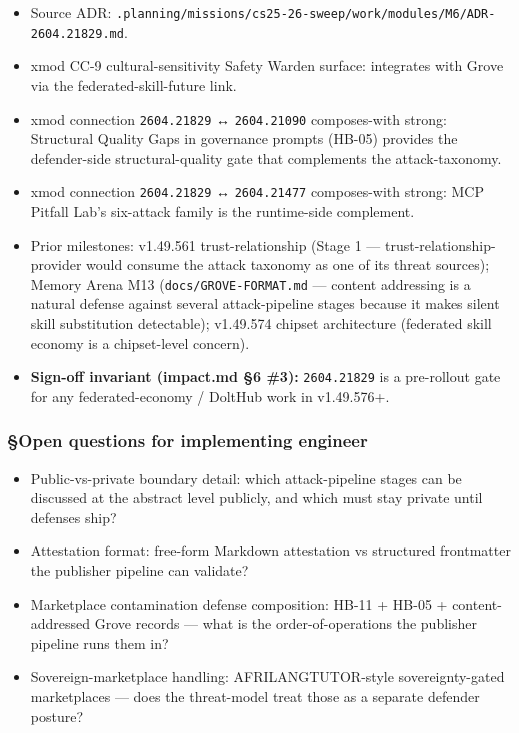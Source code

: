 \documentclass[11pt,letterpaper]{article}
\newcommand{\arxivid}[1]{\texttt{\textcolor{accent}{#1}}}
\providecommand{\tightlist}{\setlength{\itemsep}{0pt}\setlength{\parskip}{0pt}}
\begin{document}
\begin{itemize}
\tightlist
\item
  Source ADR:
  \texttt{.planning/missions/cs25-26-sweep/work/modules/M6/ADR-\arxivid{2604.21829}.md}.
\item
  xmod CC-9 cultural-sensitivity Safety Warden surface: integrates with
  Grove via the federated-skill-future link.
\item
  xmod connection \arxivid{2604.21829} ↔ \arxivid{2604.21090}
  composes-with strong: Structural Quality Gaps in governance prompts
  (HB-05) provides the defender-side structural-quality gate that
  complements the attack-taxonomy.
\item
  xmod connection \arxivid{2604.21829} ↔ \arxivid{2604.21477}
  composes-with strong: MCP Pitfall Lab's six-attack family is the
  runtime-side complement.
\item
  Prior milestones: v1.49.561 trust-relationship (Stage 1 ---
  trust-relationship-provider would consume the attack taxonomy as one
  of its threat sources); Memory Arena M13
  (\texttt{docs/GROVE-FORMAT.md} --- content addressing is a natural
  defense against several attack-pipeline stages because it makes silent
  skill substitution detectable); v1.49.574 chipset architecture
  (federated skill economy is a chipset-level concern).
\item
  \textbf{Sign-off invariant (impact.md §6 \#3):} \arxivid{2604.21829} is
  a pre-rollout gate for any federated-economy / DoltHub work in
  v1.49.576+.
\end{itemize}

\subsubsection{§Open questions for implementing
engineer}

\begin{itemize}
\tightlist
\item
  Public-vs-private boundary detail: which attack-pipeline stages can be
  discussed at the abstract level publicly, and which must stay private
  until defenses ship?
\item
  Attestation format: free-form Markdown attestation vs structured
  frontmatter the publisher pipeline can validate?
\item
  Marketplace contamination defense composition: HB-11 + HB-05 +
  content-addressed Grove records --- what is the order-of-operations
  the publisher pipeline runs them in?
\item
  Sovereign-marketplace handling: AFRILANGTUTOR-style sovereignty-gated
  marketplaces --- does the threat-model treat those as a separate
  defender posture?
\end{itemize}
\end{document}
